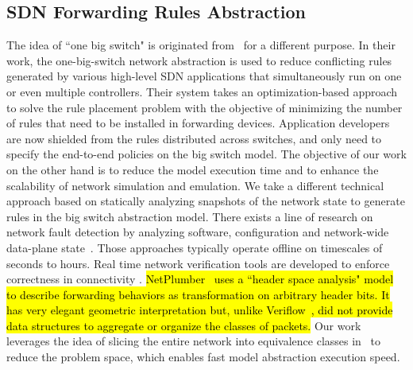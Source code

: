 
\subsection{SDN Forwarding Rules Abstraction}

The idea of ``one big switch" is originated from~\mbox{\cite{OneBigSwitchAbstraction}} for a different purpose.
In their work, the one-big-switch network abstraction is used to reduce conflicting rules generated by
various high-level SDN applications that simultaneously run on one or even multiple controllers.
Their system takes an optimization-based approach to solve the rule placement problem with
the objective of minimizing the number of rules that need to be installed in forwarding devices.
Application developers are now shielded from the rules distributed across switches, and only need to specify the end-to-end policies on the big switch model. 
The objective of our work on the other hand is to reduce the model execution time and to
enhance the scalability of network simulation and emulation.
We take a different technical approach based on statically analyzing snapshots of the network state to generate rules in the big switch abstraction model.
There exists a line of research on network fault detection by analyzing software,
configuration and network-wide data-plane state~\cite{Al-Shaer2010,Al-Shaer2009,Anteater2011,xz+05}.
Those approaches typically operate offline on timescales of seconds to hours.
Real time network verification tools are developed to enforce correctness in connectivity \cite{NetPlumber2013,Veriflow}.
\hl{
NetPlumber~\mbox{\cite{NetPlumber2013}} uses a ``header space analysis" model to
describe forwarding behaviors as transformation on arbitrary header bits.
It has very elegant geometric interpretation but, unlike Veriflow~\mbox{\cite{Veriflow}}, did not
provide data structures to aggregate or organize the classes of packets.
}
\fi
Our work leverages the idea of slicing the entire network into equivalence classes in~\cite{Veriflow}
to reduce the problem space, which enables fast model abstraction execution speed.

